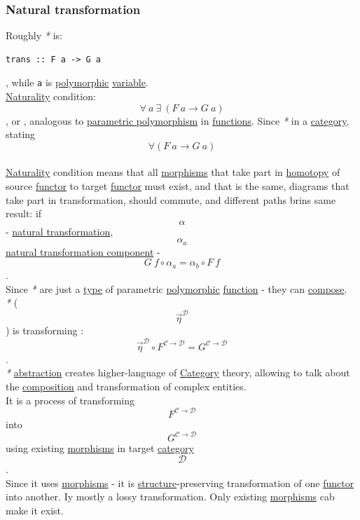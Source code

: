 \documentclass[11pt]{article}
\begin{document}
\subsubsection{\label{org381dd2b}Natural transformation}
\label{sec:org634ee03}
Roughly \emph{*} is:\\
\begin{verbatim}
trans :: F a -> G a
\end{verbatim}
, while \texttt{a} is \hyperref[org84d7fee]{polymorphic} \hyperref[org301bab5]{variable}.\\

\hyperref[org432df37]{Naturality} condition: $$ \forall \ a \ \exists \ (F \ a \to G \ a) $$, or , analogous to \hyperref[org9b7bee7]{parametric polymorphism} in \hyperref[org66c5288]{functions}. Since \emph{*} in a \hyperref[org3e3a79b]{category}, stating $$ \forall (F \ a \to G \ a) $$\\
\hyperref[org432df37]{Naturality} condition means that all \hyperref[org8ed0ce8]{morphisms} that take part in \hyperref[orgc7221e4]{homotopy} of source \hyperref[org6073683]{functor} to target \hyperref[org6073683]{functor} must exist, and that is the same, diagrams that take part in transformation, should commute, and different paths brins same result: if $$ \alpha $$ - \hyperref[org381dd2b]{natural transformation}, $$ \alpha_{a} $$ \hyperref[org8ce8d85]{natural transformation component} - $$ G \ f \circ \alpha_{a} = \alpha_{b} \circ F \ f $$.\\
Since \emph{*} are just a \hyperref[org4fbaeb8]{type} of parametric \hyperref[org84d7fee]{polymorphic} \hyperref[orgeb5cddb]{function} - they can \hyperref[orgb292e6e]{compose}.\\

\emph{*} ($$ \overrightarrow{\eta}^{\mathcal{D}} $$) is transforming : $$ \overrightarrow{\eta}^{\mathcal{D}} \circ F^{\mathcal{C \to D}} = G^{\mathcal{C \to D}} $$.\\
\emph{*} \hyperref[orgd787547]{abstraction} creates higher-language of \hyperref[org3e3a79b]{Category} theory, allowing to talk about the \hyperref[org24a8abd]{composition} and transformation of complex entities.\\

It is a process of transforming $$ F^{\mathcal{C \to D}} $$ into $$ G^{\mathcal{C \to D}} $$ using existing \hyperref[org8ed0ce8]{morphisms} in target \hyperref[org3e3a79b]{category} $$ \mathcal{D} $$.\\

Since it uses \hyperref[org8ed0ce8]{morphisms} - it is \hyperref[org93ee82c]{structure}-preserving transformation of one \hyperref[org6073683]{functor} into another. Iy mostly a lossy transformation. Only existing \hyperref[org8ed0ce8]{morphisms} cab make it exist.\\
\end{document}
